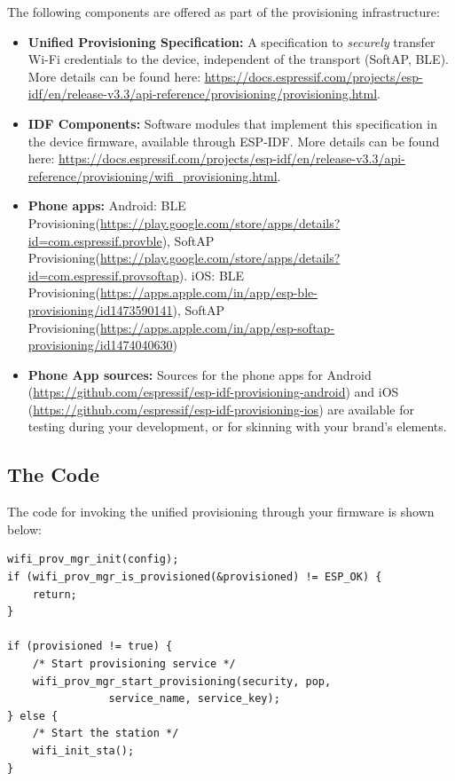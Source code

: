 \documentclass[main.tex]{subfiles}
\begin{document}
The following components are offered as part of the provisioning infrastructure:
\begin{itemize}
    \item \textbf{Unified Provisioning Specification:} A specification to \textit{securely} transfer Wi-Fi credentials to the device, independent of the transport (SoftAP, BLE). More details can be found here: \url{https://docs.espressif.com/projects/esp-idf/en/release-v3.3/api-reference/provisioning/provisioning.html}.
    \item \textbf{IDF Components:} Software modules that implement this specification in the device firmware, available through ESP-IDF. More details can be found here: \url{https://docs.espressif.com/projects/esp-idf/en/release-v3.3/api-reference/provisioning/wifi_provisioning.html}.
    \item \textbf{Phone apps:} Android: BLE Provisioning(\url{https://play.google.com/store/apps/details?id=com.espressif.provble}), SoftAP Provisioning(\url{https://play.google.com/store/apps/details?id=com.espressif.provsoftap}). iOS: BLE Provisioning(\url{https://apps.apple.com/in/app/esp-ble-provisioning/id1473590141}), SoftAP Provisioning(\url{https://apps.apple.com/in/app/esp-softap-provisioning/id1474040630})
    \item \textbf{Phone App sources:} Sources for the phone apps for Android (\url{https://github.com/espressif/esp-idf-provisioning-android}) and iOS (\url{https://github.com/espressif/esp-idf-provisioning-ios}) are available for testing during your development, or for skinning with your brand's elements.
\end{itemize}

\subsection{The Code}
The code for invoking the unified provisioning through your firmware is shown below:
\begin{verbatim}
wifi_prov_mgr_init(config);
if (wifi_prov_mgr_is_provisioned(&provisioned) != ESP_OK) {
    return;
}

if (provisioned != true) {
    /* Start provisioning service */
    wifi_prov_mgr_start_provisioning(security, pop,
                service_name, service_key);
} else {
    /* Start the station */
    wifi_init_sta();
}
\end{verbatim}
\end{document}
